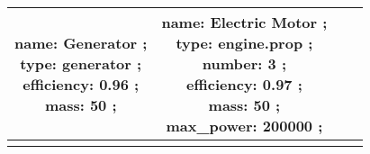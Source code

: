 \begin{table}[h]
\begin{adjustbox}{width=1\textwidth}
\begin{tabular}{|c|c|c|c|}
\makecell{name: Generator ; \\ type: generator ; \\ efficiency: 0.96 ; \\ mass: 50 ; \\ } & \makecell{name: Electric Motor ; \\ type: engine.prop ; \\ number: 3 ; \\ efficiency: 0.97 ; \\ mass: 50 ; \\ max\_power: 200000 ; \\ } &  & \\ \hline \\ 
\end{tabular} 
 \end{adjustbox} 
 \end{table} 
 \FloatBarrier 
\FloatBarrier 
